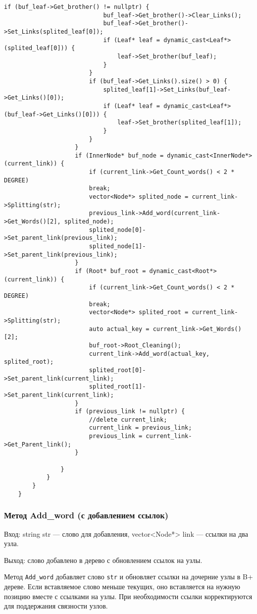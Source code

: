\documentclass[10pt,a4paper,final]{article} %
\begin{document}
\begin{lstlisting}[label=addWordMethod, caption = Метод Add\_word]
						if (buf_leaf->Get_brother() != nullptr) {
							buf_leaf->Get_brother()->Clear_Links();
							buf_leaf->Get_brother()->Set_Links(splited_leaf[0]);
							if (Leaf* leaf = dynamic_cast<Leaf*>(splited_leaf[0])) {
								leaf->Set_brother(buf_leaf);
							}
						}
						if (buf_leaf->Get_Links().size() > 0) {
							splited_leaf[1]->Set_Links(buf_leaf->Get_Links()[0]);
							if (Leaf* leaf = dynamic_cast<Leaf*>(buf_leaf->Get_Links()[0])) {
								leaf->Set_brother(splited_leaf[1]);
							}
						}
					}
					if (InnerNode* buf_node = dynamic_cast<InnerNode*>(current_link)) {
						if (current_link->Get_Count_words() < 2 * DEGREE)
						break;
						vector<Node*> splited_node = current_link->Splitting(str);
						previous_link->Add_word(current_link->Get_Words()[2], splited_node);
						splited_node[0]->Set_parent_link(previous_link);
						splited_node[1]->Set_parent_link(previous_link);
					}
					if (Root* buf_root = dynamic_cast<Root*>(current_link)) {
						if (current_link->Get_Count_words() < 2 * DEGREE)
						break;
						vector<Node*> splited_root = current_link->Splitting(str);
						auto actual_key = current_link->Get_Words()[2];
						buf_root->Root_Cleaning();
						current_link->Add_word(actual_key, splited_root);
						splited_root[0]->Set_parent_link(current_link);
						splited_root[1]->Set_parent_link(current_link);
					}
					if (previous_link != nullptr) {
						//delete current_link;
						current_link = previous_link;
						previous_link = current_link->Get_Parent_link();
					}
					
				}
			}
		}
	}\end{lstlisting}


\subsubsection{Метод Add\_word (с добавлением ссылок)}
Вход: string str — слово для добавления, vector<Node*> link — ссылки на два узла. \par
Выход: слово добавлено в дерево с обновлением ссылок на узлы. \par
\par Метод \texttt{Add\_word} добавляет слово \texttt{str} и обновляет ссылки на дочерние узлы в B+ дереве. Если вставляемое слово меньше текущих, оно вставляется на нужную позицию вместе с ссылками на узлы. При необходимости ссылки корректируются для поддержания связности узлов.
\end{document}
